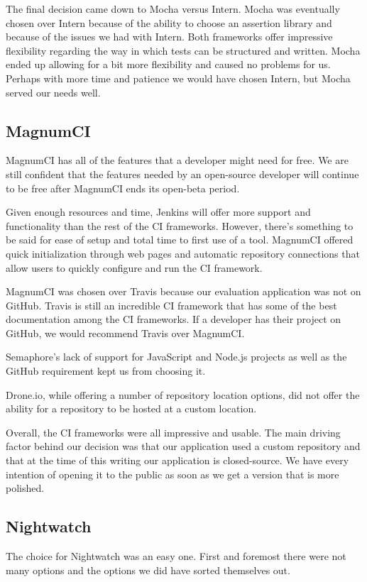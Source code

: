 \documentclass[12pt]{ucthesis}
\begin{document}
The final decision came down to Mocha versus Intern. Mocha was eventually chosen over Intern because of the ability to choose an assertion library and because of the issues we had with Intern. Both frameworks offer impressive flexibility regarding the way in which tests can be structured and written. Mocha ended up allowing for a bit more flexibility and caused no problems for us. Perhaps with more time and patience we would have chosen Intern, but Mocha served our needs well.

\subsection{MagnumCI}
MagnumCI has all of the features that a developer might need for free. We are still confident that the features needed by an open-source developer will continue to be free after MagnumCI ends its open-beta period.

Given enough resources and time, Jenkins will offer more support and functionality than the rest of the CI frameworks. However, there's something to be said for ease of setup and total time to first use of a tool. MagnumCI offered quick initialization through web pages and automatic repository connections that allow users to quickly configure and run the CI framework.

MagnumCI was chosen over Travis because our evaluation application was not on GitHub. Travis is still an incredible CI framework that has some of the best documentation among the CI frameworks. If a developer has their project on GitHub, we would recommend Travis over MagnumCI.

Semaphore's lack of support for JavaScript and Node.js projects as well as the GitHub requirement kept us from choosing it.

Drone.io, while offering a number of repository location options, did not offer the ability for a repository to be hosted at a custom location.

Overall, the CI frameworks were all impressive and usable. The main driving factor behind our decision was that our application used a custom repository and that at the time of this writing our application is closed-source. We have every intention of opening it to the public as soon as we get a version that is more polished.

\subsection{Nightwatch}
The choice for Nightwatch was an easy one. First and foremost there were not many options and the options we did have sorted themselves out.
\end{document}
